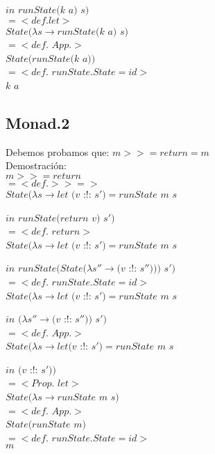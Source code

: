 \documentclass[12pt, titlepage]{article}
\begin{document}
\hspace{45pt} $in$ $runState (k$ $a)$ $s)$\\
$=<def. let>$\\
$State (\lambda s \rightarrow runState (k$ $a)$ $s)$\\
$= <def.$ $App.>$\\
$State(runState (k$ $a))$\\
$= <def.$ $runState.State = id>$\\
$k$ $a$

\newpage
\subsection*{Monad.2}
Debemos probamos que: $m >>= return = m$\\
Demostración:\\
$m >>= return$\\
$= <def. >>=>$\\
$State (\lambda s \rightarrow  let$ $(v$ :!: $s') = runState$ $m$ $s$

\hspace{45pt} $in$ $runState (return$ $v)$ $s')$\\
$=<def.$ $return>$\\
$State (\lambda s \rightarrow  let$ $(v$ :!: $s') = runState$ $m$ $s$

\hspace{45pt} $in$ $runState (State (\lambda s'' \rightarrow(v$ :!: $s'')))$ $s')$\\
$=<def.$ $runState.State = id>$\\
$State (\lambda s \rightarrow  let$ $(v$ :!: $s') = runState$ $m$ $s$
 	    
\hspace{45pt}$in$ $(\lambda s'' \rightarrow (v$ :!: $s''))$ $s')$\\
$=<def.$ $App.>$\\
$State (\lambda s \rightarrow  let$$(v$ :!: $s') = runState$ $m$ $s$
 	   
\hspace{43pt} $in$ $(v$ :!: $s'))$\\
$=<Prop.$ $let>$\\
$State (\lambda s \rightarrow  runState$ $m$ $s)$\\
$=<def.$ $App.>$\\
$State (runState$ $m)$\\
$=<def.$ $runState.State = id>$\\
$m$
\end{document}

